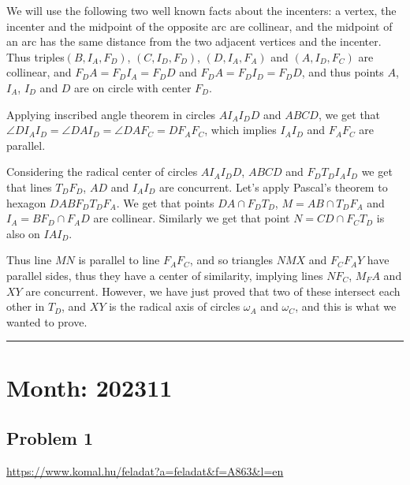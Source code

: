 \documentclass{article}
\begin{document}
We will use the following two well known facts about the incenters: a vertex, the incenter and the midpoint of the opposite arc are collinear, and the midpoint of an arc has the same distance from the two adjacent vertices and the incenter. Thus triples\(\displaystyle (B,I_A,F_D)\), \(\displaystyle (C,I_D,F_D)\), \(\displaystyle (D,I_A,F_A)\) and \(\displaystyle (A,I_D,F_C)\) are collinear, and \(\displaystyle F_DA=F_DI_A=F_DD\) and \(\displaystyle F_DA=F_DI_D=F_DD\), and thus points \(\displaystyle A\), \(\displaystyle I_A\), \(\displaystyle I_D\) and \(\displaystyle D\) are on circle with center \(\displaystyle F_D\).

Applying inscribed angle theorem in circles \(\displaystyle AI_AI_DD\) and \(\displaystyle ABCD\), we get that \(\displaystyle \angle DI_AI_D=\angle DAI_D=\angle DAF_C=DF_AF_C\), which implies \(\displaystyle I_AI_D\) and \(\displaystyle F_AF_C\) are parallel.

Considering the radical center of circles \(\displaystyle AI_AI_DD\), \(\displaystyle ABCD\) and \(\displaystyle F_DT_DI_AI_D\) we get that lines \(\displaystyle T_DF_D\), \(\displaystyle AD\) and \(\displaystyle I_AI_D\) are concurrent. Let's apply Pascal's theorem to hexagon \(\displaystyle DABF_DT_DF_A\). We get that points \(\displaystyle DA\cap F_DT_D\), \(\displaystyle M=AB\cap T_DF_A\) and \(\displaystyle I_A=BF_D\cap F_AD\) are collinear. Similarly we get that point \(\displaystyle N=CD\cap F_CT_D\) is also on \(\displaystyle IAI_D\).

Thus line \(\displaystyle MN\) is parallel to line \(\displaystyle F_AF_C\), and so triangles \(\displaystyle NMX\) and \(\displaystyle F_CF_AY\) have parallel sides, thus they have a center of similarity, implying lines \(\displaystyle NF_C\), \(\displaystyle M_FA\) and \(\displaystyle XY\) are concurrent. However, we have just proved that two of these intersect each other in \(\displaystyle T_D\), and \(\displaystyle XY\) is the radical axis of circles \(\displaystyle \omega_A\) and \(\displaystyle \omega_C\), and this is what we wanted to prove.

\vspace{1em}
\hrule
\vspace{1em}

\section*{Month: 202311}

\subsection*{Problem 1}
\noindent\url{https://www.komal.hu/feladat?a=feladat&f=A863&l=en}\\[1em]
\end{document}

